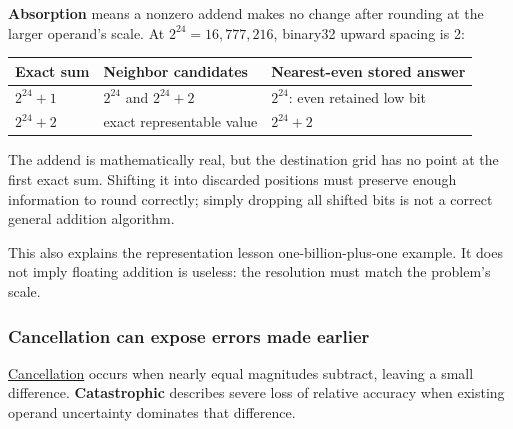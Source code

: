 \textbf{Absorption} means a nonzero addend makes no change after rounding at the larger operand's scale. At \(2^{24}=16{,}777{,}216\), binary32 upward spacing is 2:

{\def\LTcaptype{none} %
\begin{longtable}[]{@{}
  >{\raggedright\arraybackslash}p{}
  >{\raggedright\arraybackslash}p{}
  >{\raggedright\arraybackslash}p{}@{}}
\toprule\noalign{}
\begin{minipage}[b]{\linewidth}\raggedright
Exact sum
\end{minipage} & \begin{minipage}[b]{\linewidth}\raggedright
Neighbor candidates
\end{minipage} & \begin{minipage}[b]{\linewidth}\raggedright
Nearest-even stored answer
\end{minipage} \\
\midrule\noalign{}
\endhead
\bottomrule\noalign{}
\endlastfoot
\(2^{24}+1\) & \(2^{24}\) and \(2^{24}+2\) & \(2^{24}\): even retained low bit \\
\(2^{24}+2\) & exact representable value & \(2^{24}+2\) \\
\end{longtable}
}

The addend is mathematically real, but the destination grid has no point at the first exact sum. Shifting it into discarded positions must preserve enough information to round correctly; simply dropping all shifted bits is not a correct general addition algorithm.

This also explains the representation lesson one-billion-plus-one example. It does not imply floating addition is useless: the resolution must match the problem's scale.

\subsubsection{Cancellation can expose errors made earlier}\label{01-foundations-i-ch001-cancellation-can-expose-errors-made-earlier}

\hypertarget{01-foundations-i-ch001-cancellation-can-expose-errors-made-earlier}{}

\hyperref[appendix-a2773a6a2f9d]{Cancellation} occurs when nearly equal magnitudes subtract, leaving a small difference. \textbf{Catastrophic} describes severe loss of relative accuracy when existing operand uncertainty dominates that difference.

